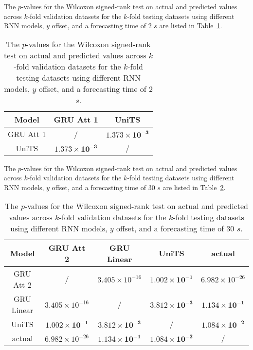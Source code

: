 The $p$-values for the Wilcoxon signed-rank test on actual and predicted values across $k$-fold validation datasets for the $k$-fold testing datasets using different RNN models, $y$ offset, and a forecasting time of $2$ $s$ are listed in Table~\ref{tab:latitude:no:abs:p:2}.

\begin{table}[!ht]
	\centering
	\begin{tabular}{|c|c|c|}
		\hline
		Model & GRU Att 1 & UniTS \\ \hline
		GRU Att 1 & / & $\mathbf{1.373 \times 10^{-3}}$ \\ \hline
		UniTS & $\mathbf{1.373 \times 10^{-3}}$ & / \\ \hline
	\end{tabular}
	\caption{The $p$-values for the Wilcoxon signed-rank test on actual and predicted values across $k$-fold validation datasets for the $k$-fold testing datasets using different RNN models, $y$ offset, and a forecasting time of $2$ $s$.}
	\label{tab:latitude:no:abs:p:2}
\end{table}

The $p$-values for the Wilcoxon signed-rank test on actual and predicted values across $k$-fold validation datasets for the $k$-fold testing datasets using different RNN models, $y$ offset, and a forecasting time of $30$ $s$ are listed in Table~\ref{tab:latitude:no:abs:p:30}.

\begin{table}[!ht]
	\centering
	\begin{tabular}{|c|c|c|c|c|}
		\hline
		Model & GRU Att 2 & GRU Linear & UniTS & actual \\ \hline
		GRU Att 2 & / & $3.405 \times 10^{-16}$ & $\mathbf{1.002 \times 10^{-1}}$ & $6.982 \times 10^{-26}$ \\ \hline
		GRU Linear & $3.405 \times 10^{-16}$ & / & $\mathbf{3.812 \times 10^{-3}}$ & $\mathbf{1.134 \times 10^{-1}}$ \\ \hline
		UniTS & $\mathbf{1.002 \times 10^{-1}}$ & $\mathbf{3.812 \times 10^{-3}}$ & / & $\mathbf{1.084 \times 10^{-2}}$ \\ \hline
		actual & $6.982 \times 10^{-26}$ & $\mathbf{1.134 \times 10^{-1}}$ & $\mathbf{1.084 \times 10^{-2}}$ & / \\ \hline
	\end{tabular}
	\caption{The $p$-values for the Wilcoxon signed-rank test on actual and predicted values across $k$-fold validation datasets for the $k$-fold testing datasets using different RNN models, $y$ offset, and a forecasting time of $30$ $s$.}
	\label{tab:latitude:no:abs:p:30}
\end{table}

